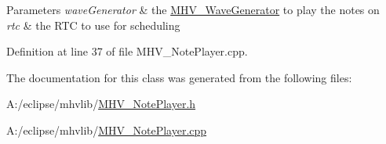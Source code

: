 \begin{DoxyParams}{\-Parameters}
{\em wave\-Generator} & the \hyperlink{class_m_h_v___wave_generator}{\-M\-H\-V\-\_\-\-Wave\-Generator} to play the notes on \\
\hline
{\em rtc} & the \-R\-T\-C to use for scheduling \\
\hline
\end{DoxyParams}


\-Definition at line 37 of file \-M\-H\-V\-\_\-\-Note\-Player.\-cpp.



\-The documentation for this class was generated from the following files\-:\begin{DoxyCompactItemize}
\item 
\-A\-:/eclipse/mhvlib/\hyperlink{_m_h_v___note_player_8h}{\-M\-H\-V\-\_\-\-Note\-Player.\-h}\item 
\-A\-:/eclipse/mhvlib/\hyperlink{_m_h_v___note_player_8cpp}{\-M\-H\-V\-\_\-\-Note\-Player.\-cpp}\end{DoxyCompactItemize}
